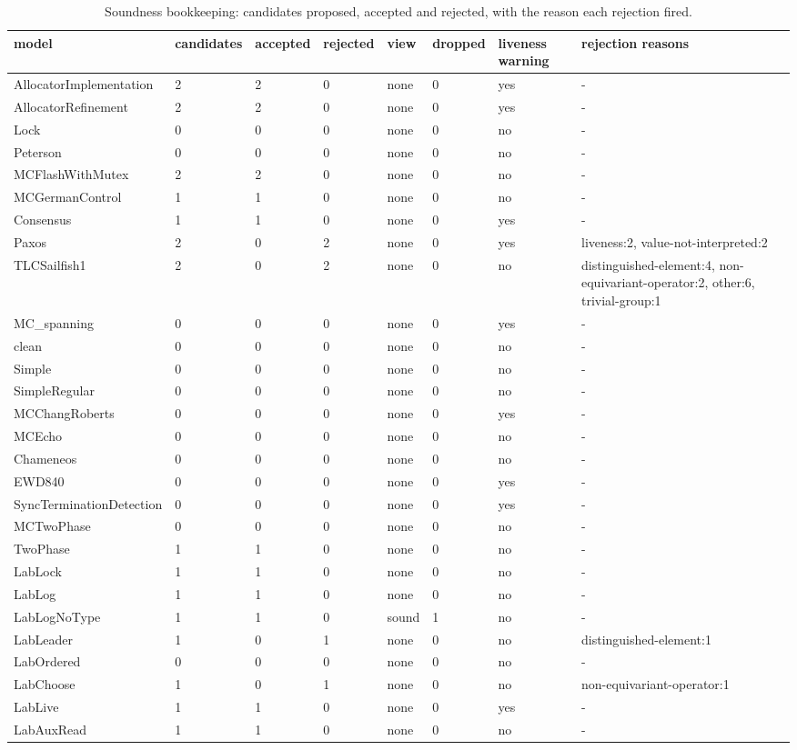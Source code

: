 \begin{table}[t]
\centering
\caption{Soundness bookkeeping: candidates proposed, accepted and rejected, with the reason each rejection fired.}
\label{tab:rq3}
\small
\begin{tabular}{llllllll}
\toprule
model & candidates & accepted & rejected & view & dropped & liveness warning & rejection reasons \\
\midrule
AllocatorImplementation & 2 & 2 & 0 & none & 0 & yes & - \\
AllocatorRefinement & 2 & 2 & 0 & none & 0 & yes & - \\
Lock & 0 & 0 & 0 & none & 0 & no & - \\
Peterson & 0 & 0 & 0 & none & 0 & no & - \\
MCFlashWithMutex & 2 & 2 & 0 & none & 0 & no & - \\
MCGermanControl & 1 & 1 & 0 & none & 0 & no & - \\
Consensus & 1 & 1 & 0 & none & 0 & yes & - \\
Paxos & 2 & 0 & 2 & none & 0 & yes & liveness:2, value-not-interpreted:2 \\
TLCSailfish1 & 2 & 0 & 2 & none & 0 & no & distinguished-element:4, non-equivariant-operator:2, other:6, trivial-group:1 \\
MC\_spanning & 0 & 0 & 0 & none & 0 & yes & - \\
clean & 0 & 0 & 0 & none & 0 & no & - \\
Simple & 0 & 0 & 0 & none & 0 & no & - \\
SimpleRegular & 0 & 0 & 0 & none & 0 & no & - \\
MCChangRoberts & 0 & 0 & 0 & none & 0 & yes & - \\
MCEcho & 0 & 0 & 0 & none & 0 & no & - \\
Chameneos & 0 & 0 & 0 & none & 0 & no & - \\
EWD840 & 0 & 0 & 0 & none & 0 & yes & - \\
SyncTerminationDetection & 0 & 0 & 0 & none & 0 & yes & - \\
MCTwoPhase & 0 & 0 & 0 & none & 0 & no & - \\
TwoPhase & 1 & 1 & 0 & none & 0 & no & - \\
LabLock & 1 & 1 & 0 & none & 0 & no & - \\
LabLog & 1 & 1 & 0 & none & 0 & no & - \\
LabLogNoType & 1 & 1 & 0 & sound & 1 & no & - \\
LabLeader & 1 & 0 & 1 & none & 0 & no & distinguished-element:1 \\
LabOrdered & 0 & 0 & 0 & none & 0 & no & - \\
LabChoose & 1 & 0 & 1 & none & 0 & no & non-equivariant-operator:1 \\
LabLive & 1 & 1 & 0 & none & 0 & yes & - \\
LabAuxRead & 1 & 1 & 0 & none & 0 & no & - \\
\bottomrule
\end{tabular}
\end{table}

